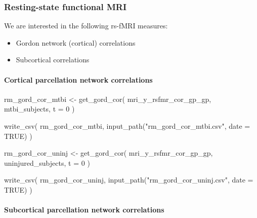 \documentclass[
  letterpaper,
  DIV=11,
  numbers=noendperiod]{scrreprt}
\let\oldparagraph\paragraph
\renewcommand{\paragraph}[1]{\oldparagraph{#1}\mbox{}}
\newenvironment{Shaded}{\begin{snugshade}}{\end{snugshade}}
\newcommand{\AttributeTok}[1]{\textcolor[rgb]{0.40,0.45,0.13}{#1}}
\newcommand{\ConstantTok}[1]{\textcolor[rgb]{0.56,0.35,0.01}{#1}}
\newcommand{\DecValTok}[1]{\textcolor[rgb]{0.68,0.00,0.00}{#1}}
\newcommand{\FunctionTok}[1]{\textcolor[rgb]{0.28,0.35,0.67}{#1}}
\newcommand{\NormalTok}[1]{\textcolor[rgb]{0.00,0.23,0.31}{#1}}
\newcommand{\OtherTok}[1]{\textcolor[rgb]{0.00,0.23,0.31}{#1}}
\newcommand{\StringTok}[1]{\textcolor[rgb]{0.13,0.47,0.30}{#1}}
\providecommand{\tightlist}{%
  \setlength{\itemsep}{0pt}\setlength{\parskip}{0pt}}\usepackage{longtable,booktabs,array}
\begin{document}
\subsubsection{Resting-state functional
MRI}\label{resting-state-functional-mri}

We are interested in the following rs-fMRI measures:

\begin{itemize}
\tightlist
\item
  Gordon network (cortical) correlations
\item
  Subcortical correlations
\end{itemize}

\paragraph{Cortical parcellation network
correlations}\label{cortical-parcellation-network-correlations}

\begin{Shaded}
\begin{Highlighting}[]
\NormalTok{rm\_gord\_cor\_mtbi }\OtherTok{\textless{}{-}} \FunctionTok{get\_gord\_cor}\NormalTok{(}
\NormalTok{    mri\_y\_rsfmr\_cor\_gp\_gp,}
\NormalTok{    mtbi\_subjects,}
    \AttributeTok{t =} \DecValTok{0}
\NormalTok{)}

\FunctionTok{write\_csv}\NormalTok{(}
\NormalTok{    rm\_gord\_cor\_mtbi, }\FunctionTok{input\_path}\NormalTok{(}\StringTok{"rm\_gord\_cor\_mtbi.csv"}\NormalTok{, }\AttributeTok{date =} \ConstantTok{TRUE}\NormalTok{)}
\NormalTok{)}

\NormalTok{rm\_gord\_cor\_uninj }\OtherTok{\textless{}{-}} \FunctionTok{get\_gord\_cor}\NormalTok{(}
\NormalTok{    mri\_y\_rsfmr\_cor\_gp\_gp,}
\NormalTok{    uninjured\_subjects,}
    \AttributeTok{t =} \DecValTok{0}
\NormalTok{)}

\FunctionTok{write\_csv}\NormalTok{(}
\NormalTok{    rm\_gord\_cor\_uninj, }\FunctionTok{input\_path}\NormalTok{(}\StringTok{"rm\_gord\_cor\_uninj.csv"}\NormalTok{, }\AttributeTok{date =} \ConstantTok{TRUE}\NormalTok{)}
\NormalTok{)}
\end{Highlighting}
\end{Shaded}

\paragraph{Subcortical parcellation network
correlations}\label{subcortical-parcellation-network-correlations}
\end{document}
